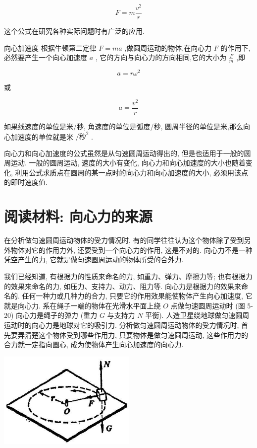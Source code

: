 \documentclass[10pt]{article}
\begin{document}
\[
F = m\frac{{v}^{2}}{r}
\]

这个公式在研究各种实际问题时有广泛的应用.

向心加速度 根据牛顿第二定律 \(F = {ma}\) ,做圆周运动的物体,在向心力 \(F\) 的作用下,必然要产生一个向心加速度 \(a\) , 它的方向与向心力的方向相同,它的大小为 \(\frac{F}{m}\) ,即

\[
a = r{\omega }^{2}
\]

或

\[
a = \frac{{v}^{2}}{r}
\]

如果线速度的单位是米/秒, 角速度的单位是弧度/秒, 圆周半径的单位是米,那么向心加速度的单位就是米 \(/{秒}^{2}\) .

向心力和向心加速度的公式虽然是从匀速圆周运动得出的, 但是也适用于一般的圆周运动. 一般的圆周运动, 速度的大小有变化, 向心力和向心加速度的大小也随着变化, 利用公式求质点在圆周的某一点时的向心力和向心加速度的大小, 必须用该点的即时速度值.

\section*{阅读材料: 向心力的来源}

在分析做匀速圆周运动物体的受力情况时, 有的同学往往认为这个物体除了受到另外物体对它的作用力外, 还要受到一个向心力的作用, 这是不对的. 向心力不是一种凭空产生的力, 它就是做匀速圆周运动的物体所受的合外力.

我们已经知道, 有根据力的性质来命名的力, 如重力、弹力、摩擦力等; 也有根据力的效果来命名的力, 如压力、支持力、动力、阻力等. 向心力是根据力的效果来命名的. 任何一种力或几种力的合力, 只要它的作用效果能使物体产生向心加速度, 它就是向心力. 系在绳子一端的物体在光滑水平面上绕 \(O\) 点做匀速圆周运动时 (图 5-20) 向心力是绳子的弹力 (重力 \(G\) 与支持力 \(N\) 平衡). 人造卫星绕地球做匀速圆周运动时的向心力是地球对它的吸引力. 分析做匀速圆周运动物体的受力情况时, 首先要弄清楚这个物体受到哪些作用力, 只要物体是做匀速圆周运动, 这些作用力的合力就一定指向圆心, 成为使物体产生向心加速度的向心力.

\begin{center}
\includegraphics[max width=0.5\textwidth]{images/01912d55-147c-70aa-b0e0-1782a122f948_146_541843.jpg}
\end{center}
\end{document}

